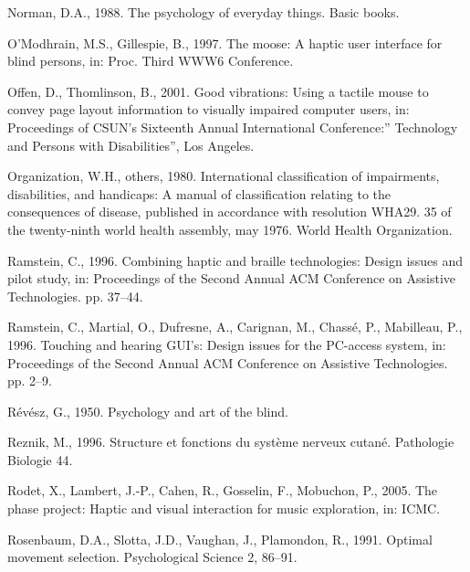 \documentclass[
]{book}
\newlength{\cslhangindent}
\newlength{\cslentryspacingunit} %
\newenvironment{CSLReferences}[2] %
 {%
  \setlength{\parindent}{0pt}
  \ifodd #1
  \let\oldpar\par
  \def\par{\hangindent=\cslhangindent\oldpar}
  \fi
  \setlength{\parskip}{#2\cslentryspacingunit}
 }%
 {}
\begin{document}
\begin{CSLReferences}{1}{0}
\leavevmode{}%
Norman, D.A., 1988. The psychology of everyday things. Basic books.

\leavevmode{}%
O'Modhrain, M.S., Gillespie, B., 1997. The moose: A haptic user interface for blind persons, in: Proc. Third WWW6 Conference.

\leavevmode{}%
Offen, D., Thomlinson, B., 2001. Good vibrations: Using a tactile mouse to convey page layout information to visually impaired computer users, in: Proceedings of CSUN's Sixteenth Annual International Conference:'' Technology and Persons with Disabilities'', Los Angeles.

\leavevmode{}%
Organization, W.H., others, 1980. International classification of impairments, disabilities, and handicaps: A manual of classification relating to the consequences of disease, published in accordance with resolution WHA29. 35 of the twenty-ninth world health assembly, may 1976. World Health Organization.

\leavevmode{}%
Ramstein, C., 1996. Combining haptic and braille technologies: Design issues and pilot study, in: Proceedings of the Second Annual ACM Conference on Assistive Technologies. pp. 37--44.

\leavevmode{}%
Ramstein, C., Martial, O., Dufresne, A., Carignan, M., Chassé, P., Mabilleau, P., 1996. Touching and hearing GUI's: Design issues for the PC-access system, in: Proceedings of the Second Annual ACM Conference on Assistive Technologies. pp. 2--9.

\leavevmode{}%
Révész, G., 1950. Psychology and art of the blind.

\leavevmode{}%
Reznik, M., 1996. Structure et fonctions du syst{è}me nerveux cutan{é}. Pathologie Biologie 44.

\leavevmode{}%
Rodet, X., Lambert, J.-P., Cahen, R., Gosselin, F., Mobuchon, P., 2005. The phase project: Haptic and visual interaction for music exploration, in: ICMC.

\leavevmode{}%
Rosenbaum, D.A., Slotta, J.D., Vaughan, J., Plamondon, R., 1991. Optimal movement selection. Psychological Science 2, 86--91.


\end{CSLReferences}
\end{document}
